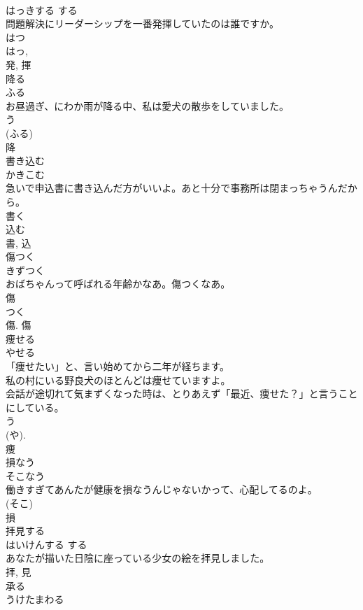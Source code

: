 \documentclass[8pt]{extreport}
\begin{document}
\begin{CJK}{UTF8}{min}
\\	はっきする	する 
\\	問題解決にリーダーシップを一番発揮していたのは誰ですか。	
\\	はつ 
\\	はっ, 
\\	発, 揮	
\\	降る	
\\	ふる	
\\	お昼過ぎ、にわか雨が降る中、私は愛犬の散歩をしていました。	
\\	う 
\\	(ふる) 
\\	降	
\\	書き込む	
\\	かきこむ	
\\	急いで申込書に書き込んだ方がいいよ。あと十分で事務所は閉まっちゃうんだから。	
\\	書く 
\\	込む 
\\	書, 込	
\\	傷つく	
\\	きずつく	
\\	おばちゃんって呼ばれる年齢かなあ。傷つくなあ。	
\\	傷 
\\	つく
\\	傷.	傷	
\\	痩せる	
\\	やせる	
\\	「痩せたい」と、言い始めてから二年が経ちます。	
\\	私の村にいる野良犬のほとんどは痩せていますよ。	
\\	会話が途切れて気まずくなった時は、とりあえず「最近、痩せた？」と言うことにしている。	
\\	う 
\\	(や). 
\\	痩	
\\	損なう	
\\	そこなう	
\\	働きすぎてあんたが健康を損なうんじゃないかって、心配してるのよ。	
\\	(そこ) 
\\	損	
\\	拝見する	
\\	はいけんする	する 
\\	あなたが描いた日陰に座っている少女の絵を拝見しました。	
\\	拝, 見	
\\	承る	
\\	うけたまわる	

\end{CJK}
\end{document}
